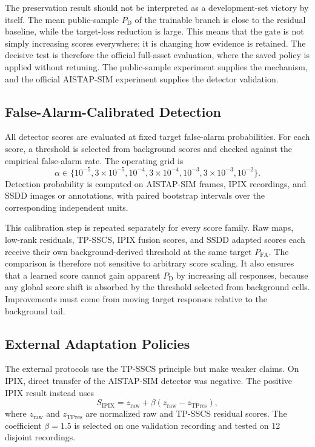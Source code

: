 \documentclass[journal]{IEEEtran}
\begin{document}
The preservation result should not be interpreted as a development-set victory by itself. The mean public-sample $P_{\mathrm{D}}$ of the trainable branch is close to the residual baseline, while the target-loss reduction is large. This means that the gate is not simply increasing scores everywhere; it is changing how evidence is retained. The decisive test is therefore the official full-asset evaluation, where the saved policy is applied without retuning. The public-sample experiment supplies the mechanism, and the official AISTAP-SIM experiment supplies the detector validation.

\subsection{False-Alarm-Calibrated Detection}

All detector scores are evaluated at fixed target false-alarm probabilities. For each score, a threshold is selected from background scores and checked against the empirical false-alarm rate. The operating grid is
\begin{equation}
    \alpha \in \{10^{-5}, 3\times10^{-5}, 10^{-4}, 3\times10^{-4},
    10^{-3}, 3\times10^{-3}, 10^{-2}\}.
\end{equation}
Detection probability is computed on AISTAP-SIM frames, IPIX recordings, and SSDD images or annotations, with paired bootstrap intervals over the corresponding independent units.

This calibration step is repeated separately for every score family. Raw maps, low-rank residuals, TP-SSCS, IPIX fusion scores, and SSDD adapted scores each receive their own background-derived threshold at the same target $P_{\mathrm{FA}}$. The comparison is therefore not sensitive to arbitrary score scaling. It also ensures that a learned score cannot gain apparent $P_{\mathrm{D}}$ by increasing all responses, because any global score shift is absorbed by the threshold selected from background cells. Improvements must come from moving target responses relative to the background tail.

\subsection{External Adaptation Policies}

The external protocols use the TP-SSCS principle but make weaker claims. On IPIX, direct transfer of the AISTAP-SIM detector was negative. The positive IPIX result instead uses
\begin{equation}
    S_{\mathrm{IPIX}} = z_{\mathrm{raw}} + \beta
    (z_{\mathrm{raw}} - z_{\mathrm{TPres}}),
\end{equation}
where $z_{\mathrm{raw}}$ and $z_{\mathrm{TPres}}$ are normalized raw and TP-SSCS residual scores. The coefficient $\beta=1.5$ is selected on one validation recording and tested on 12 disjoint recordings.
\end{document}

